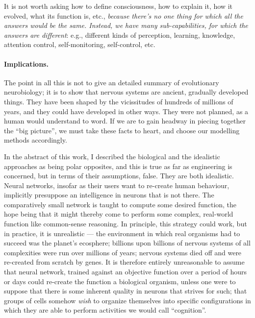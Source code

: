 \begin{emquote}
It is not worth asking how to define consciousness, how to explain it, how it evolved, what its function is, etc., {\em because there's no one thing for which all the answers would be the same. Instead, we have many sub-capabilities, for which the answers are different}: e.g., different kinds of perception, learning, knowledge, attention control, self-monitoring, self-control, etc.
\end{emquote}

\paragraph{Implications.} The point in all this is not to give an detailed summary of evolutionary neurobiology; it is to show that nervous systems are ancient, gradually developed things. They have been shaped by the vicissitudes of hundreds of millions of years, and they could have developed in other ways. They were not planned, as a human would understand to word. If we are to gain headway in piecing together the ``big picture'', we must take these facts to heart, and choose our modelling methods accordingly.

In the abstract of this work, I described the biological and the idealistic approaches as being polar opposites, and this is true as far as engineering is concerned, but in terms of their assumptions, false. They are both idealistic. Neural networks, insofar as their users want to re-create human behaviour, implicitly presuppose an intelligence in neurons that is not there. The comparatively small network is taught to compute some desired function, the hope being that it might thereby come to perform some complex, real-world function like common-sense reasoning. In principle, this strategy could work, but in practice, it is unrealistic --- the environment in which real organisms had to succeed was the planet's ecosphere; billions upon billions of nervous systems of all complexities were run over millions of years; nervous systems died off and were re-created from scratch by genes. It is therefore entirely unreasonable to assume that neural network, trained against an objective function over a period of hours or days could re-create the function a biological organism, unless one were to suppose that there is some inherent quality in neurons that strives for such; that groups of cells somehow {\em wish} to organize themselves into specific configurations in which they are able to perform activities we would call ``cognition''. 

